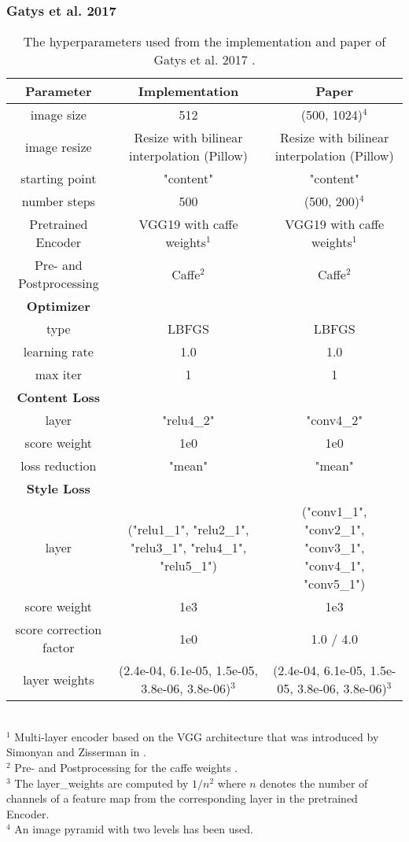 \subsubsection{Gatys et al. 2017}
\begin{landscape}
	\begin{table*}[!t]
		\renewcommand{\arraystretch}{1.0}
		\caption{The hyperparameters used from the implementation and paper of Gatys et al. 2017 \cite{GEB+2017}.}
		\label{tab:GEB+2017_parameters}
		\centering
		\begin{tabular}{c|c|c}
			\hline
			\bfseries Parameter & \bfseries Implementation & \bfseries Paper\\
			\hline\hline
			image size & 512 & (500, 1024)$^4$ \\
			image resize & Resize with bilinear interpolation (Pillow) & Resize with bilinear interpolation (Pillow)\\
			starting point & "content" & "content" \\
			number steps & 500 & (500, 200)$^4$ \\
			Pretrained Encoder & VGG19 with caffe weights$^1$ & VGG19 with caffe weights$^1$ \\
			Pre- and Postprocessing & Caffe$^2$ & Caffe$^2$\\
			\hline
			\bfseries Optimizer & &\\
			\hline
			type & LBFGS & LBFGS\\
			learning rate & 1.0 & 1.0\\
			max iter & 1 & 1 \\
			\hline
			\bfseries  Content Loss & & \\
			\hline
			layer & "relu4\_2" & "conv4\_2" \\
			score weight & 1e0 & 1e0 \\
			loss reduction & "mean" & "mean" \\
			\hline
			\bfseries  Style Loss & & \\
			\hline
			layer & ("relu1\_1", "relu2\_1", "relu3\_1", "relu4\_1", "relu5\_1") & ("conv1\_1", "conv2\_1", "conv3\_1", "conv4\_1", "conv5\_1") \\
			score weight & 1e3 & 1e3 \\
			score correction factor & 1e0 & 1.0 / 4.0 \\
			layer weights & (2.4e-04, 6.1e-05, 1.5e-05, 3.8e-06, 3.8e-06)$^3$ & (2.4e-04, 6.1e-05, 1.5e-05, 3.8e-06, 3.8e-06)$^3$ \\
			\hline
		\end{tabular}
	\raggedright
		\footnotesize{
		\\$^1$ Multi-layer encoder based on the VGG architecture that was introduced by
		Simonyan and Zisserman in \cite{SZ2015}. 
		\\$^2$ Pre- and Postprocessing for the caffe weights \cite{SZ2015}.
		\\$^3$ The layer\_weights are computed by $1/n^2$ where $n$ denotes the number of channels of a feature map from the corresponding layer in the pretrained Encoder.
		\\$^4$ An image pyramid with two levels has been used.
		}
	\end{table*}
\end{landscape}


